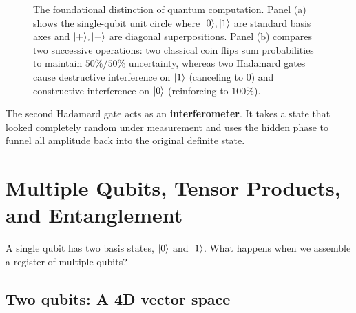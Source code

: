 \begin{figure}[H]
\caption{The foundational distinction of quantum computation. Panel (a) shows the single-qubit unit circle where $\lvert 0 \rangle, \lvert 1 \rangle$ are standard basis axes and $\lvert + \rangle, \lvert - \rangle$ are diagonal superpositions. Panel (b) compares two successive operations: two classical coin flips sum probabilities to maintain $50\%/50\%$ uncertainty, whereas two Hadamard gates cause destructive interference on $\lvert 1 \rangle$ (canceling to $0$) and constructive interference on $\lvert 0 \rangle$ (reinforcing to $100\%$).}
\label{ch42:fig-hadamard-interference}
\end{figure}

The second Hadamard gate acts as an \textbf{interferometer}.
It takes a state that looked completely random under measurement and uses the hidden
phase to funnel all amplitude back into the original definite state.

\section{Multiple Qubits, Tensor Products, and Entanglement}
\label{ch42:multi-qubit}

A single qubit has two basis states, $\lvert 0 \rangle$ and $\lvert 1 \rangle$. What happens when we
assemble a register of multiple qubits?

\subsection{Two qubits: A 4D vector space}

